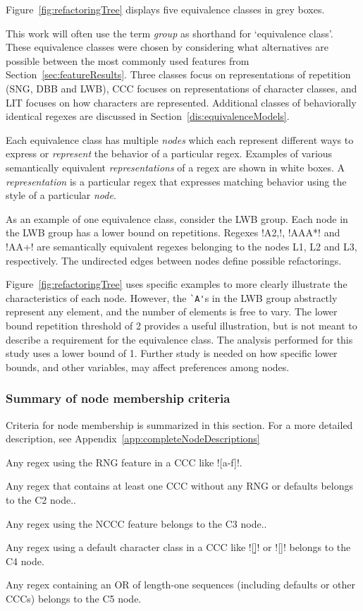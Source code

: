Figure~\ref{fig:refactoringTree} displays five equivalence classes in grey boxes.

This work will often use the term \emph{group} as shorthand for `equivalence class'.  These equivalence classes were chosen by considering what alternatives are possible between the most commonly used features from  Section~\ref{sec:featureResults}.  Three classes focus on representations of repetition (SNG, DBB and LWB), CCC focuses on representations of character classes, and LIT focuses on how characters are represented.  Additional classes of behaviorally identical regexes are discussed in Section~\ref{dis:equivalenceModels}.

Each equivalence class has multiple \emph{nodes} which each represent different ways to express or \emph{represent} the behavior of a particular regex.  Examples of various semantically equivalent \emph{representations} of a regex are shown in white boxes. A \emph{representation} is a particular regex that expresses matching behavior using the style of a particular \emph{node}.

As an example of one equivalence class, consider the LWB group.  Each node in the LWB group has a lower bound on repetitions. Regexes \cverb!A{2,}!, \cverb!AAA*! and \cverb!AA+! are semantically equivalent regexes belonging to the nodes L1, L2 and L3, respectively.
The undirected edges between nodes define possible refactorings.

Figure~\ref{fig:refactoringTree} uses specific examples to more clearly illustrate the characteristics of each node.  However, the \verb!`A'!s in the LWB group abstractly represent any element, and the number of elements is free to vary. The lower bound repetition threshold of 2 provides a useful illustration, but is not meant to describe a requirement for the equivalence class.  The analysis performed for this study uses a lower bound of 1.  Further study is needed on how specific lower bounds, and other variables, may affect preferences among nodes.

\subsubsection{Summary of node membership criteria}
Criteria for node membership is summarized in this section.  For a more detailed description, see Appendix~\ref{app:completeNodeDescriptions}

\begin{description}  \itemsep -1pt
\item[C1:] Any regex using the RNG feature in a CCC like \cverb![a-f]!.
\item[C2:] Any regex that contains at least one CCC without any RNG or defaults belongs to the C2 node..
\item[C3:] Any regex using the NCCC feature belongs to the C3 node..
\item[C4:] Any regex using a default character class in a CCC like \cverb![\d]! or \cverb![\W]! belongs to the C4 node.
\item[C5:] Any regex containing an OR of length-one sequences (including defaults or other CCCs) belongs to the C5 node.
\end{description}

